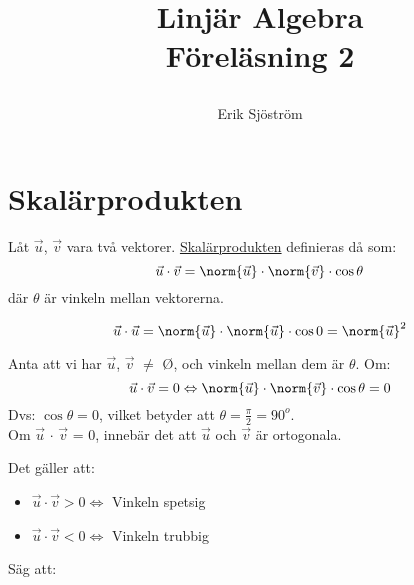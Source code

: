 

\title{
	Linjär Algebra\\
	Föreläsning 2
	\author{Erik Sjöström}
}



\maketitle

\section{Skalärprodukten} %
\label{sec:skal_rprodukten}

Låt $\vec{u}$, $\vec{v}$ vara två vektorer. \underline{Skalärprodukten} definieras då som:
\begin{equation}
    \vec{u} \cdot \vec{v} = \norm{\vec{u}} \cdot \norm{\vec{v}} \cdot \cos{\theta}
\end{equation}
där $\theta$ är vinkeln mellan vektorerna.
\begin{Ex}
    \[
        \vec{u} \cdot \vec{u} = \norm{\vec{u}} \cdot \norm{\vec{u}} \cdot \cos{0} = \norm{\vec{u}}^2
    \]
\end{Ex}
\begin{Ex}
    Anta att vi har $\vec{u}$, $\vec{v}$ $\neq$ \O, och vinkeln mellan dem är $\theta$. Om:
    \[
        \vec{u} \cdot \vec{v} = 0 \Leftrightarrow \norm{\vec{u}} \cdot \norm{\vec{v}} \cdot \cos{\theta} = 0
    \]
    Dvs: $\cos{\theta} = 0$, vilket betyder att $\theta = \frac{\pi}{2} = 90^o$. \\
    Om $\vec{u}$ $\cdot$ $\vec{v}$ = 0, innebär det att $\vec{u}$ och $\vec{v}$ är ortogonala.
\end{Ex}
\noindent
Det gäller att:
\begin{itemize}
  \item $\vec{u} \cdot \vec{v} > 0 \Leftrightarrow$ Vinkeln spetsig
  \item $\vec{u} \cdot \vec{v} < 0 \Leftrightarrow$ Vinkeln trubbig
\end{itemize}

Säg att:

